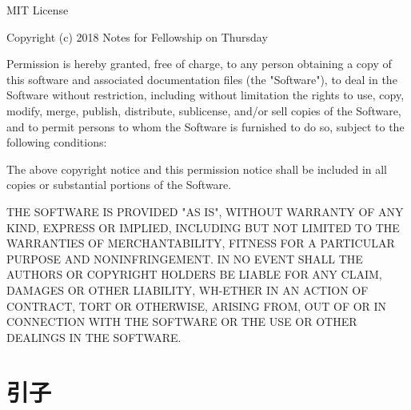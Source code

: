 \documentclass[Chinese,inNight]{CKBib}
\begin{document}
\begin{footnotesize}

\clearpage

\noindent MIT License

\vspace{1em}

\noindent Copyright (c) 2018 Notes for Fellowship on Thursday

\vspace{1em}

\noindent Permission is hereby granted, free of charge, to any person obtaining a copy of this software and associated documentation files (the "Software"), to deal in the Software without restriction, including without limitation the rights to use, copy, modify, merge, publish, distribute, sublicense, and/or sell copies of the Software, and to permit persons to whom the Software is furnished to do so, subject to the following conditions:

\noindent The above copyright notice and this permission notice shall be included in all copies or substantial portions of the Software.

\noindent THE SOFTWARE IS PROVIDED "AS IS", WITHOUT WARRANTY OF ANY KIND, EXPRESS OR IMPLIED, INCLUDING BUT NOT LIMITED TO THE WARRANTIES OF MERCHANTABILITY, FITNESS FOR A PARTICULAR PURPOSE AND NONINFRINGEMENT. IN NO EVENT SHALL THE AUTHORS OR COPYRIGHT HOLDERS BE LIABLE FOR ANY CLAIM, DAMAGES OR OTHER LIABILITY, WH-ETHER IN AN ACTION OF CONTRACT, TORT OR OTHERWISE, ARISING FROM, OUT OF OR IN CONNECTION WITH THE SOFTWARE OR THE USE OR OTHER DEALINGS IN THE SOFTWARE.

\end{footnotesize}

\clearpage
\hbox{}
\vspace*{\fill}
\thispagestyle{empty}
\newpage

\thispagestyle{empty}
\pagestyle{empty}

\renewcommand{\contentsname}{\chapFont 目录}
\tableofcontents*

\clearpage

\thispagestyle{ruled}
\pagestyle{ruled}
\setcounter{page}{1} 

\chapter*{\chapFont 引子}
\end{document}
